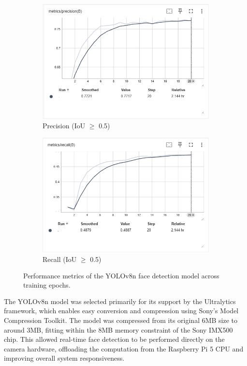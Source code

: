 \begin{figure}[H]
	\begin{subfigure}[b]{0.48\textwidth}
		\includegraphics[width=\textwidth]{figures/chapter4/precision.png}
		\caption{Precision (IoU $\geq$ 0.5)}
	\end{subfigure}
	\hfill
	\begin{subfigure}[b]{0.48\textwidth}
		\includegraphics[width=\textwidth]{figures/chapter4/recall.png}
		\caption{Recall (IoU $\geq$ 0.5)}
	\end{subfigure}
	
	\caption{Performance metrics of the YOLOv8n face detection model across training epochs.}
	\label{fig:yolo-metrics}
\end{figure}

The YOLOv8n model was selected primarily for its support by the Ultralytics framework, which enables easy conversion and compression using Sony's Model Compression Toolkit. The model was compressed from its original 6MB size to around 3MB, fitting within the 8MB memory constraint of the Sony IMX500 chip. This allowed real-time face detection to be performed directly on the camera hardware, offloading the computation from the Raspberry Pi 5 CPU and improving overall system responsiveness.

